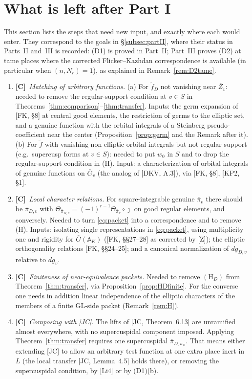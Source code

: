 \documentclass[12pt]{article}
\newcommand{\ov}[1]{\overline{#1}}
\newcommand{\A}{\mathbb{A}}
\newcommand{\GL}{\mathrm{GL}}
\newcommand{\Gb}{\ov{G}}
\newcommand{\Zb}{\ov{Z}}
\newcommand{\pib}{\ov{\pi}}
\newcommand{\jj}{\jmath}
\newcommand{\Cv}{\textbf{[C]}}
\theoremstyle{plain}
\theoremstyle{definition}
\begin{document}
\section{What is left after Part I}\label{sec:deferred}
This section lists the steps that need new input, and exactly where each would enter. They correspond to the goals in \S\ref{subsec:partII}, where their status in Parts~II and~III is recorded: (D1) is proved in Part~II; Part~III proves (D2) at tame places where the corrected Flicker--Kazhdan correspondence is available (in particular when $(n,N_r)=1$), as explained in Remark~\ref{rem:D2tame}.

\begin{enumerate}[label=(D\arabic*),leftmargin=3em]
\item \Cv\ \emph{Matching of arbitrary functions.} (a) For $\tilde f_D$ not vanishing near $\Zb_v$: needed to remove the regular-support condition at $v\in S$ in Theorems~\ref{thm:comparison}--\ref{thm:transfer}. Inputs: the germ expansion of [FK, \S8] at central good elements, the restriction of germs to the elliptic set, and a genuine function with the orbital integrals of a Steinberg pseudo-coefficient near the center (Proposition~\ref{prop:germ} and the Remark after it). (b) For $\tilde f$ with vanishing non-elliptic orbital integrals but not regular support (e.g.\ supercusp forms at $v\in S$): needed to put $w_0$ in $S$ and to drop the regular-support condition in (H). Input: a characterization of orbital integrals of genuine functions on $\Gb_v$ (the analog of [DKV, A.3]), via [FK, \S8], [KP2, \S1].
\item \Cv\ \emph{Local character relations.} For square-integrable genuine $\pib_v$ there should be $\pib_{D,v}$ with $\Theta_{\pib_{D,v}}=(-1)^{r-1}\Theta_{\pib_v}\circ\jj$ on good regular elements, and conversely. Needed to turn \eqref{eq:packet} into a correspondence and to remove (H). Inputs: isolating single representations in \eqref{eq:packet}, using multiplicity one and rigidity for $\Gb(\A_K)$ ([FK, \S\S27--28] as corrected by [Z]); the elliptic orthogonality relations [FK, \S\S24--25]; and a canonical normalization of $dg_{D,v}$ relative to $dg_v$.
\item \Cv\ \emph{Finiteness of near-equivalence packets.} Needed to remove $(\mathrm H_D)$ from Theorem~\ref{thm:transfer}, via Proposition~\ref{prop:HDfinite}. For the converse one needs in addition linear independence of the elliptic characters of the members of a finite $\GL$-side packet (Remark~\ref{rem:H}).
\item \Cv\ \emph{Composing with [JC].} The lifts of [JC, Theorem~6.13] are unramified almost everywhere, with no supercuspidal component imposed. Applying Theorem~\ref{thm:transfer} requires one supercuspidal $\pib_{D,w_0}$. That means either extending [JC] to allow an arbitrary test function at one extra place inert in $L$ (the local transfer [JC, Lemma~4.5] holds there), or removing the supercuspidal condition, by [Li4] or by (D1)(b).
\end{enumerate}
\end{document}
